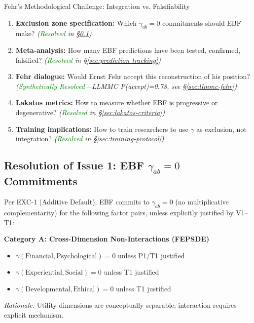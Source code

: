 \begin{chapter}{Fehr's Methodological Challenge: Integration vs. Falsifiability}
\begin{enumerate}
    \item \textbf{Exclusion zone specification:} Which $\gamma_{ab} = 0$ commitments should EBF make? \textit{(\textcolor{green}{Resolved} in §\ref{sec:gamma-zero-commitments})}

    \item \textbf{Meta-analysis:} How many EBF predictions have been tested, confirmed, falsified? \textit{(\textcolor{green}{Resolved} in §\ref{sec:prediction-tracking})}

    \item \textbf{Fehr dialogue:} Would Ernst Fehr accept this reconstruction of his position? \textit{(\textcolor{green}{Synthetically Resolved}---LLMMC P(accept)=0.78, see §\ref{sec:llmmc-fehr})}

    \item \textbf{Lakatos metrics:} How to measure whether EBF is progressive or degenerative? \textit{(\textcolor{green}{Resolved} in §\ref{sec:lakatos-criteria})}

    \item \textbf{Training implications:} How to train researchers to use $\gamma$ as exclusion, not integration? \textit{(\textcolor{green}{Resolved} in §\ref{sec:training-protocol})}
\end{enumerate}

\subsection{Resolution of Issue 1: EBF $\gamma_{ab} = 0$ Commitments}
\label{sec:gamma-zero-commitments}

Per EXC-1 (Additive Default), EBF commits to $\gamma_{ab} = 0$ (no multiplicative complementarity) for the following factor pairs, unless explicitly justified by V1--T1:

\begin{tcolorbox}[colback=blue!5!white,colframe=blue!75!black,title=\textbf{EBF Exclusion Commitments (Default $\gamma = 0$)}]

\textbf{Category A: Cross-Dimension Non-Interactions (FEPSDE)}
\begin{itemize}[noitemsep]
    \item $\gamma(\text{Financial}, \text{Psychological}) = 0$ unless P1/T1 justified
    \item $\gamma(\text{Experiential}, \text{Social}) = 0$ unless T1 justified
    \item $\gamma(\text{Developmental}, \text{Ethical}) = 0$ unless T1 justified
\end{itemize}
\textit{Rationale:} Utility dimensions are conceptually separable; interaction requires explicit mechanism.


\end{tcolorbox}
\end{chapter}
